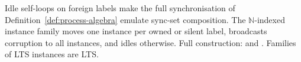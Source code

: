 \begin{definition}
  \label{def:idle-family}
  \leanok
  Idle self-loops on foreign labels make the full synchronisation of
  Definition~\ref{def:process-algebra} emulate sync-set composition.
  The $\mathbb{N}$-indexed instance family moves one instance per owned or
  silent label, broadcasts corruption to all instances, and idles otherwise.
  Full construction:  and .
  Families of LTS instances are LTS.\leanok
\end{definition}
